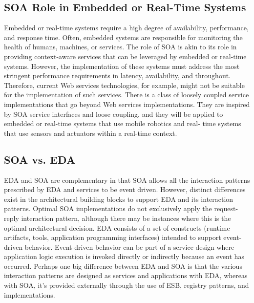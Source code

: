 \documentclass[12pt,a4paper,final,twoside,onecolumn,titlepage]{book}
\begin{document}
\subsection{SOA Role in Embedded or Real-Time Systems}
Embedded or real-time systems require a high degree of availability, performance, and response time. Often, embedded systems are responsible for monitoring the health of humans, machines, or services. The role of \gls{SOA} is akin to its role in providing context-aware services that can be leveraged by embedded or real-time systems. However, the implementation of these systems must address the most stringent performance requirements in latency, availability, and throughout. Therefore, current Web services technologies, for example, might not be suitable for the implementation of such services. There is a class of loosely coupled service implementations that go beyond Web services implementations. They are inspired by \gls{SOA} service interfaces and loose coupling, and they will be applied to embedded or real-time systems that use mobile robotics and real- time systems that use sensors and actuators within a real-time context.
\subsection{SOA vs. EDA}
EDA and \gls{SOA} are complementary in that \gls{SOA} allows all the interaction patterns prescribed by EDA and services to be event driven. However, distinct differences exist in the architectural building blocks to support EDA and its interaction patterns. Optimal \gls{SOA} implementations do not exclusively apply the request-reply interaction pattern, although there may be instances where this is the optimal architectural decision. EDA consists of a set of constructs (runtime artifacts, tools, application programming interfaces) intended to support event-driven behavior. Event-driven behavior can be part of a service design where application logic execution is invoked directly or indirectly because an event has occurred. Perhaps one big difference between EDA and \gls{SOA} is that the various interaction patterns are designed as services and applications with EDA, whereas with \gls{SOA}, it’s provided externally through the use of ESB, registry patterns, and implementations.
\end{document}
